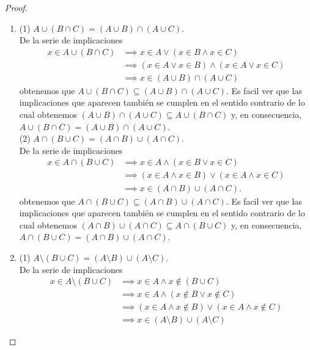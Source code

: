 \documentclass[12pt,a4paper]{article}
\begin{document}
    \begin{proof}
        \begin{enumerate}
            \item[(c)] (1) $A\cup(B\cap C)=(A\cup B)\cap(A\cup C)$.\\
            De la serie de implicaciones
            \begin{align*}
                x\in A\cup(B\cap C)&\implies x\in A\vee(x\in B\wedge x\in C)\\
                &\implies(x\in A\vee x\in B)\wedge(x\in A\vee x\in C)\\
                &\implies x\in (A\cup B)\cap(A\cup C)
            \end{align*}
            obtenemos que $A\cup(B\cap C)\subseteq(A\cup B)\cap(A\cup C)$. Es facil ver que las implicaciones que aparecen también se cumplen
            en el sentido contrario de lo cual obtenemos $(A\cup B)\cap(A\cup C)\subseteq A\cup(B\cap C)$ y, en consecuencia, $A\cup(B\cap C)=(A\cup B)\cap(A\cup C)$.\\
            (2) $A\cap(B\cup C)=(A\cap B)\cup(A\cap C)$.\\
            De la serie de implicaciones
            \begin{align*}
                x\in A\cap(B\cup C)&\implies x\in A\wedge(x\in B\vee x\in C)\\
                &\implies(x\in A\wedge x\in B)\vee(x\in A\wedge x\in C)\\
                &\implies x\in(A\cap B)\cup(A\cap C).
            \end{align*}
            obtenemos que $A\cap(B\cup C)\subseteq(A\cap B)\cup(A\cap C)$. Es facil ver que las implicaciones que aparecen también se cumplen en el sentido contrario
            de lo cual obtenemos $(A\cap B)\cup(A\cap C)\subseteq A\cap(B\cup C)$ y, en consecuencia, $A\cap(B\cup C)=(A\cap B)\cup(A\cap C)$.
            \item[(d)] (1) $A\setminus(B\cup C)=(A\setminus B)\cup(A\setminus C)$.\\
            De la serie de implicaciones
            \begin{align*}
                x\in A\setminus (B\cup C)&\implies x\in A\wedge x\notin(B\cup C)\\
                &\implies x\in A\wedge(x\notin B\vee x\notin C)\\
                &\implies (x\in A\wedge x\notin B)\vee(x\in A\wedge x\notin C)\\
                &\implies x\in (A\setminus B)\cup(A\setminus C)

\end{align*}
\end{enumerate}
\end{proof}
\end{document}
